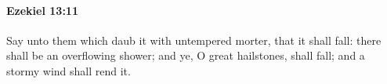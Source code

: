 
		\paragraph{Ezekiel 13:11} %
			\label{EZEKIEL-13-11}

			Say unto them which daub it with untempered morter, that it shall fall: there shall be an overflowing shower; and ye, O great hailstones, shall fall; and a stormy wind shall rend it.



